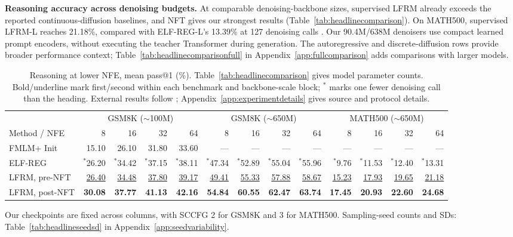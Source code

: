 \documentclass{article}
\begin{document}
\textbf{Reasoning accuracy across denoising budgets.}
\label{sec:headlinecomparison}
\label{sec:headlinelownfe}
At comparable denoising-backbone sizes, supervised LFRM already exceeds the reported continuous-diffusion baselines, and NFT gives our strongest results (Table~\ref{tab:headlinecomparison}). On MATH500, supervised LFRM-L reaches 21.18\%, compared with ELF-REG-L's 13.39\% at 127 denoising calls \citep{scalingdlm}. Our 90.4M/638M denoisers use compact learned prompt encoders, without executing the teacher Transformer during generation. The autoregressive and discrete-diffusion rows provide broader performance context; Table~\ref{tab:headlinecomparisonfull} in Appendix~\ref{app:fullcomparison} adds comparisons with larger models.

\begin{table}[!htb]
\caption{Reasoning at lower NFE, mean pass@1 (\%). Table~\ref{tab:headlinecomparison} gives model parameter counts. Bold/underline mark first/second within each benchmark and backbone-scale block; $^{*}$ marks one fewer denoising call than the heading. External results follow \citet{posterior,scalingdlm}; Appendix~\ref{app:experimentdetails} gives source and protocol details.}
\label{tab:headlinelownfe}
\centering\small
\setlength{\tabcolsep}{1.7pt}
\begin{tabular}{@{}l*{12}{r}@{}}
\toprule
& \multicolumn{4}{c}{GSM8K ($\sim$100M)} & \multicolumn{4}{c}{GSM8K ($\sim$650M)} & \multicolumn{4}{c}{MATH500 ($\sim$650M)}\\
\cmidrule(lr){2-5}\cmidrule(lr){6-9}\cmidrule(lr){10-13}
Method / NFE & 8 & 16 & 32 & 64 & 8 & 16 & 32 & 64 & 8 & 16 & 32 & 64\\
\midrule
FMLM+ Init & 15.10 & 26.10 & 31.80 & 33.60 & --- & --- & --- & --- & --- & --- & --- & ---\\
ELF-REG & $^{*}$26.20 & $^{*}$34.42 & $^{*}$37.15 & $^{*}$38.11 & $^{*}$47.34 & $^{*}$52.89 & $^{*}$55.04 & $^{*}$55.96 & $^{*}$9.76 & $^{*}$11.53 & $^{*}$12.40 & $^{*}$13.31\\
LFRM, pre-NFT & \underline{26.40} & \underline{34.48} & \underline{37.80} & \underline{39.17} & \underline{49.41} & \underline{55.33} & \underline{57.88} & \underline{58.67} & \underline{15.23} & \underline{17.93} & \underline{19.65} & \underline{21.18}\\
LFRM, post-NFT & \textbf{30.08} & \textbf{37.77} & \textbf{41.13} & \textbf{42.16} & \textbf{54.84} & \textbf{60.55} & \textbf{62.47} & \textbf{63.74} & \textbf{17.45} & \textbf{20.93} & \textbf{22.60} & \textbf{24.68}\\
\bottomrule
\end{tabular}
\vspace{3pt}
\parbox{\linewidth}{\footnotesize Our checkpoints are fixed across columns, with SCCFG 2 for GSM8K and 3 for MATH500. Sampling-seed counts and SDs: Table~\ref{tab:headlineseedsd} in Appendix~\ref{app:seedvariability}.}
\end{table}
\end{document}

